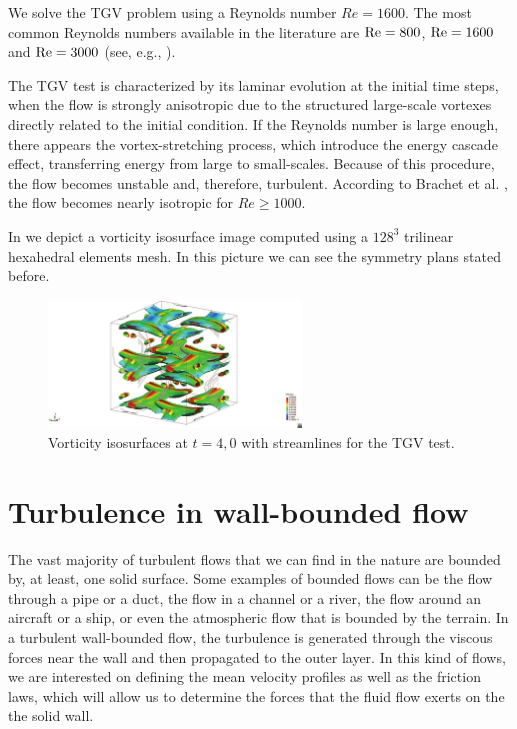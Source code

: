 We solve the TGV problem using a Reynolds number $Re=1600$. The most common Reynolds numbers available in the literature are ${\rm Re}=800$, ${\rm Re}=1600$ and ${\rm Re}=3000$ (see, e.g., \cite{andrea_d._beck_numerical_2012, fauconnier_construction_2009, gassner_accuracy_2013, jb_chapelier_final_2012}).

The TGV test is characterized by its laminar evolution at the initial time steps, when the flow is strongly anisotropic due to the structured large-scale vortexes directly related to the initial condition. If the Reynolds number is large enough, there appears the vortex-stretching process, which introduce the energy cascade effect, transferring energy from large to small-scales. Because of this procedure, the flow becomes unstable and, therefore, turbulent. According to Brachet et al. \cite{brachet_small-scale_1983}, the flow becomes nearly isotropic for $Re\geq1000$.

In  we depict a vorticity isosurface image computed using a $128^3$ trilinear hexahedral elements mesh. In this picture we can see the symmetry plans stated before.

\begin{figure}[h!]
	\centering	
	\includegraphics[clip=true, trim=13cm 0cm 13cm 0cm, width=0.6\textwidth]{Figures/Chapter3/TGV_isovorti_streaml_veloc_1}
	\caption{Vorticity isosurfaces at $t=4,0$ with streamlines for the TGV test.}
	\label{fig-TGV_vorticity_streamlines}
\end{figure}

\section{Turbulence in wall-bounded flow}
\label{sec-C3_wall_bounded}
The vast majority of turbulent flows that we can find in the nature are bounded by, at least, one solid surface. Some examples of bounded flows can be the flow through a pipe or a duct, the flow in a channel or a river, the flow around an aircraft or a ship, or even the atmospheric flow that is bounded by the terrain. In a turbulent wall-bounded flow, the turbulence is generated through the viscous forces near the wall and then propagated to the outer layer. In this kind of flows, we are interested on defining the mean velocity profiles as well as the friction laws, which will allow us to determine the forces that the fluid flow exerts on the the solid wall.
